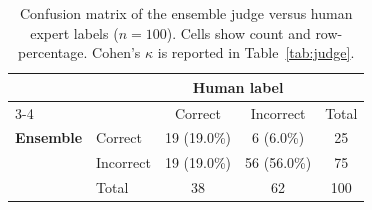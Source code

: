 \begin{table}[t]
\centering
\caption{Confusion matrix of the ensemble judge versus human expert labels ($n = 100$). Cells show count and row-percentage. Cohen's $\kappa$ is reported in Table~\ref{tab:judge}.}
\label{tab:confusion}
\begin{tabular}{l l c c c}
\toprule
 & & \multicolumn{2}{c}{\textbf{Human label}} & \\
\cmidrule(lr){3-4}
 & & Correct & Incorrect & Total \\
\midrule
\textbf{Ensemble} & Correct & 19 (19.0\%) & 6 (6.0\%) & 25 \\
 & Incorrect & 19 (19.0\%) & 56 (56.0\%) & 75 \\
\midrule
& Total & 38 & 62 & 100 \\
\bottomrule
\end{tabular}
\end{table}